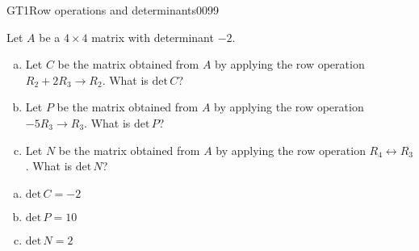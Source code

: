 \begin{exercise}{GT1}{Row operations and determinants}{0099} 
\begin{exerciseStatement} 

Let \(A\) be a \(4 \times 4\) matrix with determinant \(-2\).

 

\begin{enumerate}[(a)]
\item Let \(C\) be the matrix obtained from \(A\) by applying the row operation \(R_2 + 2 R_3 \to R_2\). What is \(\mathrm{det}\,C\)?
\item Let \(P\) be the matrix obtained from \(A\) by applying the row operation \(-5 R_3 \to R_3\). What is \(\mathrm{det}\,P\)?
\item Let \(N\) be the matrix obtained from \(A\) by applying the row operation \(R_4 \leftrightarrow R_3\). What is \(\mathrm{det}\,N\)?
\end{enumerate}

     \end{exerciseStatement}
 \begin{exerciseAnswer} 

\begin{enumerate}[(a)]
\item \(\mathrm{det}\,C=-2\)
\item \(\mathrm{det}\,P=10\)
\item \(\mathrm{det}\,N=2\)
\end{enumerate}

     \end{exerciseAnswer}
 \end{exercise}


\newpage




